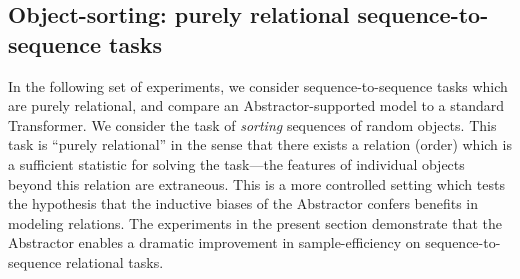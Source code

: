 \subsection{Object-sorting: purely relational sequence-to-sequence tasks}\label{ssec:experiments_object_sorting}

In the following set of experiments, we consider sequence-to-sequence tasks which are purely relational, and compare an Abstractor-supported model to a standard Transformer. We consider the task of \textit{sorting} sequences of random objects. This task is ``purely relational'' in the sense that there exists a relation (order) which is a sufficient statistic for solving the task---the features of individual objects beyond this relation are extraneous. This is a more controlled setting which tests the hypothesis that the inductive biases of the Abstractor confers benefits in modeling relations. The experiments in the present section demonstrate that the Abstractor enables a dramatic improvement in sample-efficiency on sequence-to-sequence relational tasks.
